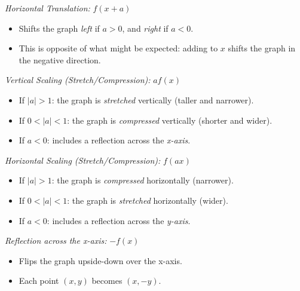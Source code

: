 \emph{Horizontal Translation:} \( f(x + a) \)

\begin{itemize}

	\item Shifts the graph \emph{left} if \( a > 0 \), and \emph{right} if \( a < 0 \).

	\item This is opposite of what might be expected: adding to \(x\) shifts the graph in the negative
	      direction.

\end{itemize}

\emph{Vertical Scaling (Stretch/Compression):} \( a f(x) \)

\begin{itemize}

	\item If \( |a| > 1 \): the graph is \emph{stretched} vertically (taller and narrower).

	\item If \( 0 < |a| < 1 \): the graph is \emph{compressed} vertically (shorter and wider).

	\item If \( a < 0 \): includes a reflection across the \emph{x-axis}.

\end{itemize}

\emph{Horizontal Scaling (Stretch/Compression):} \( f(a x) \)

\begin{itemize}

	\item If \( |a| > 1 \): the graph is \emph{compressed} horizontally (narrower).

	\item If \( 0 < |a| < 1 \): the graph is \emph{stretched} horizontally (wider).

	\item If \( a < 0 \): includes a reflection across the \emph{y-axis}.

\end{itemize}

\emph{Reflection across the x-axis:} \( -f(x) \)

\begin{itemize}

	\item Flips the graph upside-down over the x-axis.

	\item Each point \( (x, y) \) becomes \( (x, -y) \).

\end{itemize}

